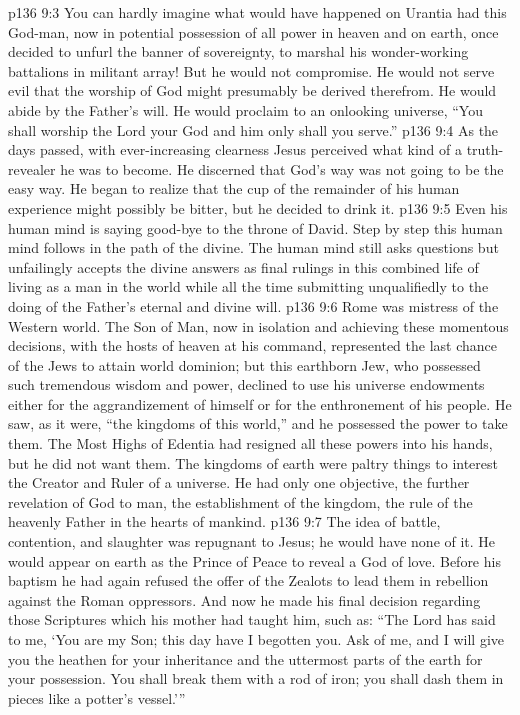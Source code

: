 \vs p136 9:3 You can hardly imagine what would have happened on Urantia had this God\hyp{}man, now in potential possession of all power in heaven and on earth, once decided to unfurl the banner of sovereignty, to marshal his wonder\hyp{}working battalions in militant array! But he would not compromise. He would not serve evil that the worship of God might presumably be derived therefrom. He would abide by the Father’s will. He would proclaim to an onlooking universe, \textcolor{ubdarkred}{“You shall worship the Lord your God and him only shall you serve.”}
\vs p136 9:4 As the days passed, with ever\hyp{}increasing clearness Jesus perceived what kind of a truth\hyp{}revealer he was to become. He discerned that God’s way was not going to be the easy way. He began to realize that the cup of the remainder of his human experience might possibly be bitter, but he decided to drink it.
\vs p136 9:5 Even his human mind is saying good\hyp{}bye to the throne of David. Step by step this human mind follows in the path of the divine. The human mind still asks questions but unfailingly accepts the divine answers as final rulings in this combined life of living as a man in the world while all the time submitting unqualifiedly to the doing of the Father’s eternal and divine will.
\vs p136 9:6 Rome was mistress of the Western world. The Son of Man, now in isolation and achieving these momentous decisions, with the hosts of heaven at his command, represented the last chance of the Jews to attain world dominion; but this earthborn Jew, who possessed such tremendous wisdom and power, declined to use his universe endowments either for the aggrandizement of himself or for the enthronement of his people. He saw, as it were, “the kingdoms of this world,” and he possessed the power to take them. The Most Highs of Edentia had resigned all these powers into his hands, but he did not want them. The kingdoms of earth were paltry things to interest the Creator and Ruler of a universe. He had only one objective, the further revelation of God to man, the establishment of the kingdom, the rule of the heavenly Father in the hearts of mankind.
\vs p136 9:7 The idea of battle, contention, and slaughter was repugnant to Jesus; he would have none of it. He would appear on earth as the Prince of Peace to reveal a God of love. Before his baptism he had again refused the offer of the Zealots to lead them in rebellion against the Roman oppressors. And now he made his final decision regarding those Scriptures which his mother had taught him, such as: “The Lord has said to me, ‘You are my Son; this day have I begotten you. Ask of me, and I will give you the heathen for your inheritance and the uttermost parts of the earth for your possession. You shall break them with a rod of iron; you shall dash them in pieces like a potter’s vessel.’”
